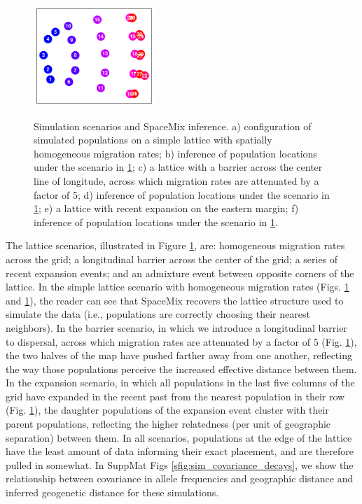 \documentclass[12pt]{article}
\begin{document}
\begin{figure}
			{\includegraphics[width=1.8in,height=1.5in]{figs/sims/GeoGenMap_expansion.pdf}}

	\caption{Simulation scenarios and SpaceMix inference.  a) configuration of simulated populations on a simple lattice with spatially homogeneous migration rates; b) inference of population locations under the scenario in \ref{sfig:lattice_scenarios};  c) a lattice with a barrier across the center line of longitude, across which migration rates are attenuated by a factor of 5; d) inference of population locations under the scenario in \ref{sfig:lattice_scenarios}; e) a lattice with recent expansion on the eastern margin; f) inference of population locations under the scenario in \ref{sfig:lattice_scenarios}.}\label{sfig:lattice_scenarios}
\end{figure}

The lattice scenarios, illustrated in Figure \ref{sfig:lattice_scenarios}, are: homogeneous migration rates across the grid; a longitudinal barrier across the center of the grid; a series of recent expansion events; and an admixture event between opposite corners of the lattice.  In the simple lattice scenario with homogeneous migration rates (Figs. \ref{sfig:lattice_scenarios} and \ref{sfig:lattice_scenarios}), the reader can see that SpaceMix recovers the lattice structure used to simulate the data (i.e., populations are correctly choosing their nearest neighbors).  In the barrier scenario, in which we introduce a longitudinal barrier to dispersal, across which migration rates are attenuated by a factor of 5 (Fig. \ref{sfig:lattice_scenarios}), the two halves of the map have pushed farther away from one another, reflecting the way those populations perceive the increased effective distance between them.  In the expansion scenario, in which all populations in the last five columns of the grid have expanded in the recent past from the nearest population in their row (Fig. \ref{sfig:lattice_scenarios}), the daughter populations of the expansion event cluster with their parent populations, reflecting the higher relatedness (per unit of geographic separation) between them.  In all scenarios, populations at the edge of the lattice have the least amount of data informing their exact placement, and are therefore pulled in somewhat.  In SuppMat Figs \ref{sfig:sim_covariance_decays}, we show the relationship between covariance in allele frequencies and geographic distance and inferred geogenetic distance for these simulations.
\end{document}

